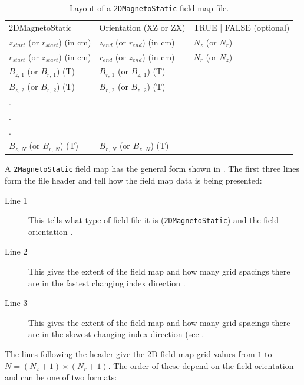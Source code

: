 \begin{table}[ht!]
    \caption{Layout of a \texttt{2DMagnetoStatic} field map file.}
    \label{tab:2DMagnetoStatic}
    \begin{center}
    \begin{tabular}{lll}
      \hline
      2DMagnetoStatic & Orientation (XZ or ZX) & TRUE | FALSE (optional) \\
      $z_{start}$ (or $r_{start}$) (in cm) & $z_{end}$ (or $r_{end}$) (in cm) & $N_{z}$ (or $N_{r}$) \\
      $r_{start}$ (or $z_{start}$) (in cm) & $r_{end}$ (or $z_{end}$) (in cm) & $N_{r}$ (or $N_{z}$) \\
      $B_{z,\,1}$ (or $B_{r,\,1}$) (T) & $B_{r,\,1}$ (or $B_{z,\,1}$) (T)& \\
      $B_{z,\,2}$ (or $B_{r,\,2}$) (T) & $B_{r,\,2}$ (or $B_{z,\,2}$) (T)& \\
      . & & \\
      . & & \\
      . & & \\
      $B_{z,\,N}$ (or $B_{r,\,N}$) (T) & $B_{r,\,N}$ (or $B_{z,\,N}$) (T)& \\
      \hline
    \end{tabular}
    \end{center}
\end{table}

A \texttt{2MagnetoStatic} field map has the general form shown in . The first three lines form
the file header and tell \opalt how the field map data is being presented:

\begin{description}
\item[Line 1] This tells \opalt what type of field file it is (\texttt{2DMagnetoStatic}) and the field orientation
  .
\item[Line 2] This gives the extent of the field map and how many grid spacings there are in the fastest changing
  index direction .
\item[Line 3] This gives the extent of the field map and how many grid spacings there are in the slowest changing
  index direction (see .
\end{description}

The lines following the header give the 2D field map grid values from $1$ to $N = (N_{z} + 1) \times (N_{r} + 1)$.
The order of these depend on the field orientation  and can be one of two formats:


